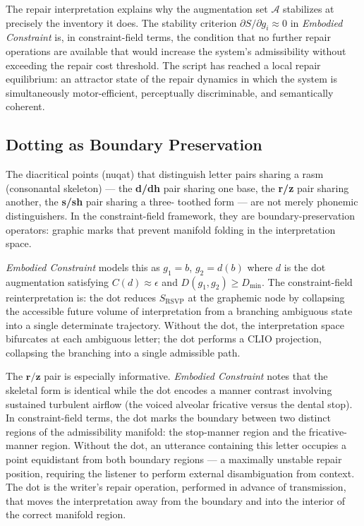 \documentclass[11pt, a4paper]{article}
\theoremstyle{definition}
\theoremstyle{remark}
\begin{document}
The repair interpretation explains why the augmentation set $\mathcal{A}$
stabilizes at precisely the inventory it does. The stability criterion
$\partial S / \partial g_i \approx 0$ in \textit{Embodied Constraint} is,
in constraint-field terms, the condition that no further repair operations
are available that would increase the system's admissibility without exceeding
the repair cost threshold. The script has reached a local repair equilibrium:
an attractor state of the repair dynamics in which the system is simultaneously
motor-efficient, perceptually discriminable, and semantically coherent.

\subsection{Dotting as Boundary Preservation}

The diacritical points (nuqat) that distinguish letter pairs sharing a rasm
(consonantal skeleton) --- the \textbf{d/dh} pair sharing one base, the
\textbf{r/z} pair sharing another, the \textbf{s/sh} pair sharing a three-
toothed form --- are not merely phonemic distinguishers. In the constraint-field
framework, they are boundary-preservation operators: graphic marks that prevent
manifold folding in the interpretation space.

\textit{Embodied Constraint} models this as $g_1 = b$, $g_2 = d(b)$ where
$d$ is the dot augmentation satisfying $C(d) \approx \epsilon$ and
$D(g_1, g_2) \geq D_{\min}$. The constraint-field reinterpretation is: the
dot reduces $S_{\mathrm{RSVP}}$ at the graphemic node by collapsing the
accessible future volume of interpretation from a branching ambiguous state
into a single determinate trajectory. Without the dot, the interpretation
space bifurcates at each ambiguous letter; the dot performs a CLIO projection,
collapsing the branching into a single admissible path.

The $\mathbf{r/z}$ pair is especially informative. \textit{Embodied Constraint}
notes that the skeletal form is identical while the dot encodes a manner
contrast involving sustained turbulent airflow (the voiced alveolar fricative
versus the dental stop). In constraint-field terms, the dot marks the boundary
between two distinct regions of the admissibility manifold: the stop-manner
region and the fricative-manner region. Without the dot, an utterance
containing this letter occupies a point equidistant from both boundary regions
--- a maximally unstable repair position, requiring the listener to perform
external disambiguation from context. The dot is the writer's repair operation,
performed in advance of transmission, that moves the interpretation away from
the boundary and into the interior of the correct manifold region.
\end{document}

